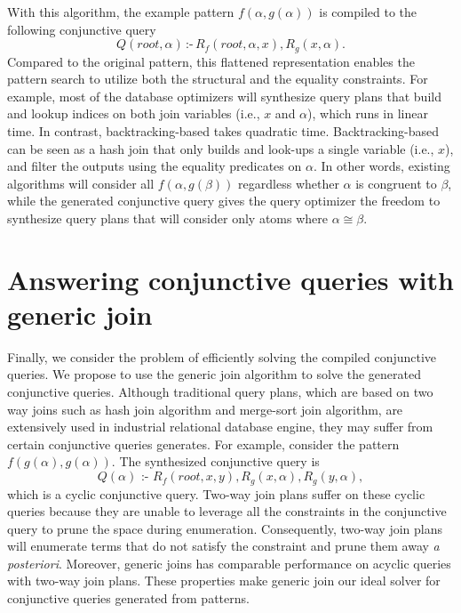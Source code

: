 With this algorithm, the example pattern $f(\alpha, g(\alpha))$
 is compiled to the following conjunctive query $$Q(\textit{root},\alpha)\,\textit{:-}\,R_f(\textit{root},\alpha,x),R_g(x,\alpha).$$
Compared to the original \ematching pattern, this flattened representation enables the pattern search to utilize both the structural and the equality constraints. For example, most of the database optimizers will synthesize query plans that build and lookup indices on both join variables (i.e., $x$ and $\alpha$), which runs in linear time. In contrast,  backtracking-based \ematching takes quadratic time. Backtracking-based \ematching can be seen as a hash join that only builds and look-ups a single variable (i.e., $x$), and filter the outputs using the equality predicates on $\alpha$. In other words, existing \ematching algorithms will consider all $f(\alpha, g(\beta))$ regardless whether $\alpha$ is congruent to $\beta$, while the generated conjunctive query gives the query optimizer the freedom to synthesize query plans that will consider only atoms where $\alpha\cong\beta$.

\section{Answering conjunctive queries with generic join}

Finally, we consider the problem of efficiently solving the compiled conjunctive queries. We propose to use the generic join algorithm to solve the generated conjunctive queries.
Although traditional query plans, which are based on two way joins such as hash join algorithm and merge-sort join algorithm, are extensively used in industrial relational database engine, they may suffer from certain conjunctive queries \ematching generates. For example, consider the pattern $f(g(\alpha),g(\alpha))$. The synthesized conjunctive query is $$Q(\alpha)\textit{ :- }R_f(\textit{root}, x, y), R_g(x, \alpha), R_g(y, \alpha),$$ which is a cyclic conjunctive query. Two-way join plans suffer on these cyclic queries because they are unable to leverage all the constraints in the conjunctive query to prune the space during enumeration. Consequently, two-way join plans will enumerate terms that do not satisfy the constraint and prune them away \textit{a posteriori}. Moreover, generic joins has comparable performance on acyclic queries with two-way join plans.
These properties make generic join our ideal solver for conjunctive queries generated from \ematching patterns.
